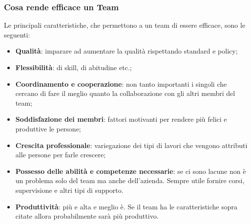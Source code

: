 \subsubsection{Cosa rende efficace un Team}
Le principali caratteristiche, che permettono a un team di essere efficace,
sono le seguenti:
\begin{itemize}
	\item \textbf{Qualità}: imparare ad aumentare la qualità rispettando standard e policy;
	\item \textbf{Flessibilità}: di skill, di abitudine etc.;
	\item \textbf{Coordinamento e cooperazione}: non tanto importanti i singoli che cercano di fare il meglio quanto la collaborazione con gli altri membri del team;
	\item \textbf{Soddisfazione dei membri}: fattori motivanti per rendere più felici e produttive le persone;
	\item \textbf{Crescita professionale}: variegazione dei tipi di lavori che vengono attributi alle persone per farle crescere;
	\item \textbf{Possesso delle abilità e competenze necessarie}: se ci sono lacune non è un problema solo del team ma anche dell'azienda. Sempre utile fornire corsi, supervisione e altri tipi di supporto.
	\item \textbf{Produttività}: più e alta e meglio è. Se il team ha le caratteristiche sopra citate allora probabilmente sarà più produttivo.
\end{itemize}

